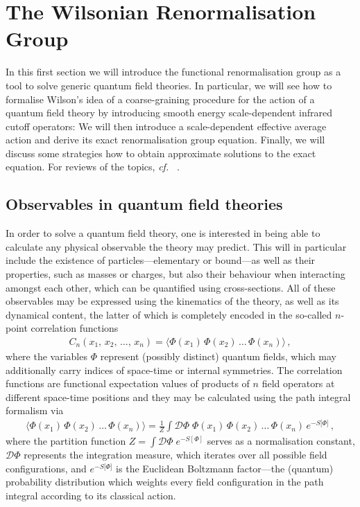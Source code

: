 \documentclass[11pt]{book}
\newcommand\cf{\textit{cf.}\ }
\numberwithin{equation}{chapter}
\begin{document}
\section{The Wilsonian Renormalisation Group}

In this first section we will introduce the functional renormalisation group as
a tool to solve generic quantum field theories. In particular, we will see how to
formalise Wilson's idea of a coarse-graining procedure for the action
of a quantum field theory by introducing smooth energy scale-dependent
infrared cutoff operators: We will then introduce a scale-dependent
effective average action and derive its exact renormalisation group equation.
Finally, we will discuss some strategies how to obtain approximate solutions
to the exact equation. For reviews of the topics, \cf
\cite{
  Berges:2000ew,
  Aoki:2000wm,
  Pawlowski:2005xe,
  Gies:2006wv,
  Rosten:2010vm
}.


\subsection{Observables in quantum field theories}

In order to solve a quantum field theory, one is interested in
being able to calculate any physical observable the theory may predict.
This will in particular include the existence of particles---elementary
or bound---as well as their properties, such as masses or charges,
but also their behaviour when interacting amongst each other, which
can be quantified using cross-sections.
All of these observables may be expressed using the kinematics
of the theory, as well as its dynamical content, the latter of
which is completely encoded in the so-called $n$-point correlation
functions
\begin{align}
  C_n(x_1, \, x_2,\, \dots, \, x_n) =
  \big\langle  \Phi(x_1) \, \Phi(x_2) \, \dots \, \Phi(x_n) \big\rangle \,,
\end{align}
where the variables $\Phi$ represent (possibly distinct) quantum fields,
which may additionally carry indices of space-time or internal symmetries.
The correlation functions are functional expectation values of products of $n$ field
operators at different space-time positions and they may be
calculated using the path integral formalism via
\begin{align}
  \big\langle  \Phi(x_1) \, \Phi(x_2) \, \dots \, \Phi(x_n) \big\rangle
  = \frac{1}{Z} \int \mathcal D \Phi \;
  \Phi(x_1) \, \Phi(x_2) \, \dots \, \Phi(x_n) \, e^{-S \lbrack \Phi \rbrack } \,,
  \label{eq:expvalue}
\end{align}
where the partition function $Z = \int \mathcal D \Phi \; e^{-S[\Phi]}$ serves as a
normalisation constant, $\mathcal D \Phi$ represents the integration measure,
which iterates over all possible field configurations, and $e^{-S \lbrack \Phi \rbrack}$
is the Euclidean Boltzmann factor---the (quantum) probability distribution
which weights every field configuration in the path integral
according to its classical action.
\end{document}

